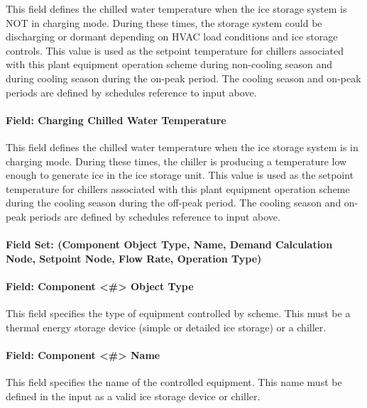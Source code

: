 This field defines the chilled water temperature when the ice storage system is NOT in charging mode. During these times, the storage system could be discharging or dormant depending on HVAC load conditions and ice storage controls. This value is used as the setpoint temperature for chillers associated with this plant equipment operation scheme during non-cooling season and during cooling season during the on-peak period. The cooling season and on-peak periods are defined by schedules reference to input above.

\paragraph{Field: Charging Chilled Water Temperature}\label{field-charging-chilled-water-temperature}

This field defines the chilled water temperature when the ice storage system is in charging mode. During these times, the chiller is producing a temperature low enough to generate ice in the ice storage unit. This value is used as the setpoint temperature for chillers associated with this plant equipment operation scheme during the cooling season during the off-peak period. The cooling season and on-peak periods are defined by schedules reference to input above.

\paragraph{Field Set: (Component Object Type, Name, Demand Calculation Node, Setpoint Node, Flow Rate, Operation Type)}\label{field-set-component-object-type-name-demand-calculation-node-setpoint-node-flow-rate-operation-type}

\paragraph{Field: Component \textless{}\#\textgreater{} Object Type}\label{field-component-object-type-001}

This field specifies the type of equipment controlled by scheme. This must be a thermal energy storage device (simple or detailed ice storage) or a chiller.

\paragraph{Field: Component \textless{}\#\textgreater{} Name}\label{field-component-name-002}

This field specifies the name of the controlled equipment. This name must be defined in the input as a valid ice storage device or chiller.

